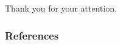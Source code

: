 \documentclass{beamer}
\begin{document}
	{
		\begin{frame}[noframenumbering]{}
			\begin{center}
				\Huge Thank you for your attention.
			\end{center}
		\end{frame}
	}
	
	\begin{frame}
		\frametitle{References}
		
		
	\end{frame}
	
\end{document}
